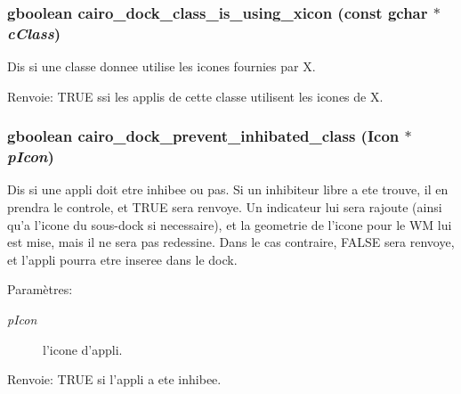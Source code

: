 \subsubsection{\setlength{\rightskip}{0pt plus 5cm}gboolean cairo\_\-dock\_\-class\_\-is\_\-using\_\-xicon (const gchar $\ast$ {\em cClass})}\label{cairo-dock-class-manager_8h_e32327ef4ecea98797f8e9ea633d18a3}


Dis si une classe donnee utilise les icones fournies par X. \begin{Desc}
\item[Renvoie:]TRUE ssi les applis de cette classe utilisent les icones de X. \end{Desc}
\subsubsection{\setlength{\rightskip}{0pt plus 5cm}gboolean cairo\_\-dock\_\-prevent\_\-inhibated\_\-class ({\bf Icon} $\ast$ {\em pIcon})}\label{cairo-dock-class-manager_8h_d0d6f72a22ef8edecf020060c9a0f6d0}


Dis si une appli doit etre inhibee ou pas. Si un inhibiteur libre a ete trouve, il en prendra le controle, et TRUE sera renvoye. Un indicateur lui sera rajoute (ainsi qu'a l'icone du sous-dock si necessaire), et la geometrie de l'icone pour le WM lui est mise, mais il ne sera pas redessine. Dans le cas contraire, FALSE sera renvoye, et l'appli pourra etre inseree dans le dock. \begin{Desc}
\item[Paramètres:]
\begin{description}
\item[{\em pIcon}]l'icone d'appli. \end{description}
\end{Desc}
\begin{Desc}
\item[Renvoie:]TRUE si l'appli a ete inhibee. \end{Desc}
